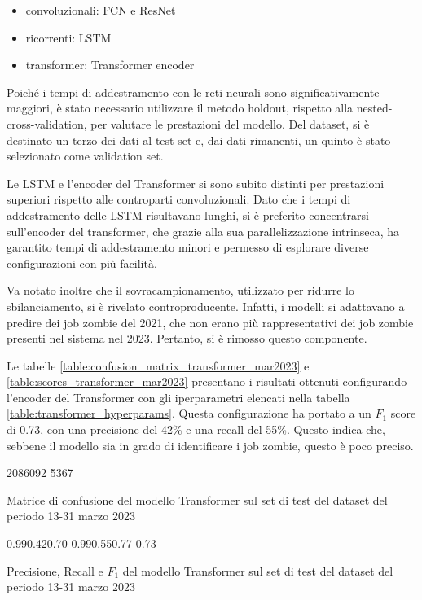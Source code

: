 \begin{itemize}
    \item convoluzionali: FCN e ResNet \cite{long2015, he2015}
    \item ricorrenti: LSTM \cite{hochreiter1997}
    \item transformer: Transformer encoder \cite{vaswani2023}
\end{itemize}

Poiché i tempi di addestramento con le reti neurali sono significativamente
maggiori, è stato necessario utilizzare il metodo holdout, rispetto alla
nested-cross-validation, per valutare le prestazioni del modello. Del dataset,
si è destinato un terzo dei dati al test set e, dai dati rimanenti, un quinto
è stato selezionato come validation set.

Le LSTM e l'encoder del Transformer si sono subito distinti per prestazioni
superiori rispetto alle controparti convoluzionali. Dato che i tempi di
addestramento delle LSTM risultavano lunghi, si è preferito concentrarsi
sull'encoder del transformer, che grazie alla sua parallelizzazione
intrinseca, ha garantito tempi di addestramento minori e permesso di esplorare
diverse configurazioni con più facilità.

Va notato inoltre che il sovracampionamento, utilizzato per ridurre lo
sbilanciamento, si è rivelato controproducente. Infatti, i modelli si
adattavano a predire dei job zombie del 2021, che non erano più
rappresentativi dei job zombie presenti nel sistema nel 2023. Pertanto, si è
rimosso questo componente.

Le tabelle \ref{table:confusion_matrix_transformer_mar2023} e
\ref{table:scores_transformer_mar2023} presentano i risultati ottenuti
configurando l'encoder del Transformer con gli iperparametri elencati nella
tabella \ref{table:transformer_hyperparams}. Questa configurazione ha portato
a un $F_1$ score di 0.73, con una precisione del 42\% e una recall del 55\%.
Questo indica che, sebbene il modello sia in grado di identificare i job
zombie, questo è poco preciso.

\begin{table}[!ht]
    \centering 
    \confusionmatrix%
    {20860}{92}%
    {53}{67} 
    \caption{\small Matrice di confusione del modello Transformer sul set di
    test del dataset del periodo 13-31 marzo 2023}
   \label{table:confusion_matrix_transformer_mar2023}
\end{table}

\begin{table}[!ht]
    \centering 
    \scores%
    {0.99}{0.42}{0.70}%
    {0.99}{0.55}{0.77}%
    {0.73} 
    \caption{\small Precisione, Recall e $F_1$ del modello Transformer sul set
    di test del dataset del periodo 13-31 marzo 2023}
    \label{table:scores_transformer_mar2023}
\end{table}

